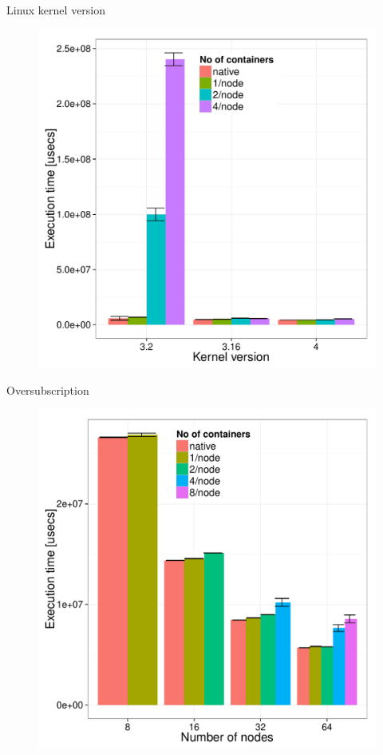 \documentclass[presentation]{beamer}
\begin{document}
\begin{frame}[label=sec-3-2]{Linux kernel version}
\begin{figure}[!h]
  \center
  \includegraphics[scale=0.40]{figures/execution_time-kernel-cgB.pdf}
  \label{fig:hpc}
\end{figure}
\end{frame}

\begin{frame}[label=sec-3-3]{Oversubscription}
\begin{figure}[!h]
  \center
  \includegraphics[scale=0.40]{figures/execution_time-tso-40.pdf}
  \label{fig:hpc}
\end{figure}
\end{frame}
\end{document}
